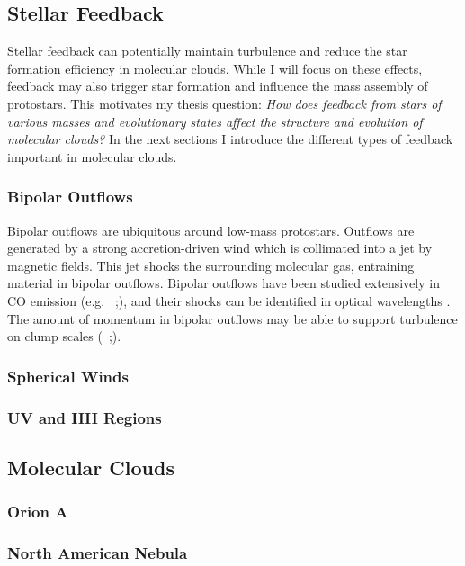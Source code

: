\subsection{Stellar Feedback}\label{sec:feedback}
Stellar feedback can potentially maintain turbulence and reduce the star formation efficiency in molecular clouds. While I will focus on these effects, feedback may also trigger star formation and influence the mass assembly of protostars. This motivates my thesis question: \textit{How does feedback from stars of various masses and evolutionary states affect the structure and evolution of molecular clouds?} In the next sections I introduce the different types of feedback important in molecular clouds.

\subsubsection{Bipolar Outflows}\label{sec:outflow}
Bipolar outflows are ubiquitous around low-mass protostars. Outflows are generated by a strong accretion-driven wind which is collimated into a jet by magnetic fields. This jet shocks the surrounding molecular gas, entraining material in bipolar outflows. Bipolar outflows have been studied extensively in CO emission (e.g. \citet{Plunkett_2013}~;\cite{Plunkett_2015}), and their shocks can be identified in optical wavelengths \cite{Reipurth_2001}. The amount of momentum in bipolar outflows may be able to support turbulence on clump scales (\citet{Frank14}~;\citet{Offner_2014}).

\subsubsection{Spherical Winds}\label{sec:wind}

\subsubsection{UV and HII Regions}\label{sec:uv}

\subsection{Molecular Clouds}\label{sec:clouds}

\subsubsection{Orion A}\label{sec:orion}

\subsubsection{North American Nebula}\label{sec:nan}
  
  
  
  
  